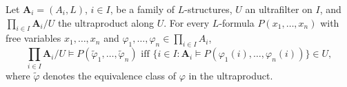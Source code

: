 Let $\mathbf{A}_i = (A_i, L)$, $i \in I$, be a family of $L$-structures, $U$ an ultrafilter on $I$, and $\prod_{i \in I} \mathbf{A}_i / U$ the ultraproduct along $U$. For every $L$-formula $P(x_1, \ldots, x_n)$ with free variables $x_1, \ldots, x_n$ and $\varphi_1, \ldots, \varphi_n \in \prod_{i \in I} A_i$,
$$\prod_{i \in I} \mathbf{A}_i / U \vDash P(\tilde{\varphi}_1, \ldots, \tilde{\varphi}_n) \text{ iff } \{i \in I : \mathbf{A}_i \vDash P(\varphi_1(i), \ldots, \varphi_n(i))\} \in U,$$
where $\tilde{\varphi}$ denotes the equivalence class of $\varphi$ in the ultraproduct.
